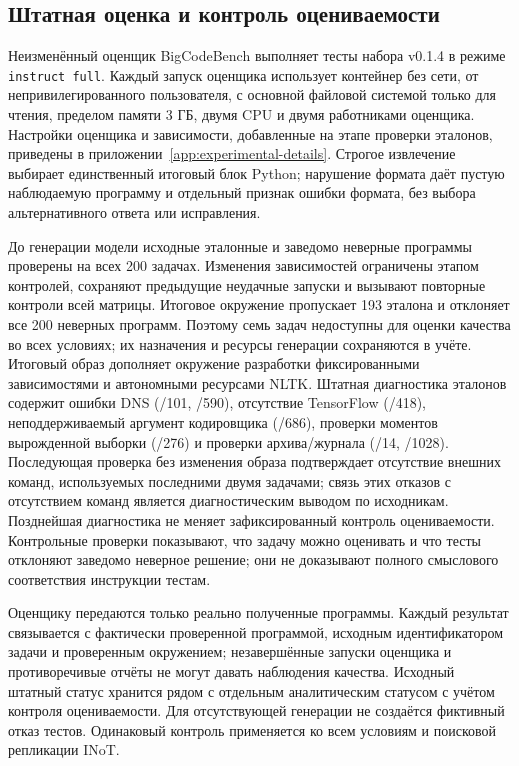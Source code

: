 \subsection{Штатная оценка и контроль оцениваемости}
Неизменённый оценщик BigCodeBench выполняет тесты набора v0.1.4 в режиме \texttt{instruct full}. Каждый запуск оценщика использует контейнер без сети, от непривилегированного пользователя, с основной файловой системой только для чтения, пределом памяти 3 ГБ, двумя CPU и двумя работниками оценщика. Настройки оценщика и зависимости, добавленные на этапе проверки эталонов, приведены в приложении~\ref{app:experimental-details}. Строгое извлечение выбирает единственный итоговый блок Python; нарушение формата даёт пустую наблюдаемую программу и отдельный признак ошибки формата, без выбора альтернативного ответа или исправления.

До генерации модели исходные эталонные и заведомо неверные программы проверены на всех 200 задачах. Изменения зависимостей ограничены этапом контролей, сохраняют предыдущие неудачные запуски и вызывают повторные контроли всей матрицы. Итоговое окружение пропускает 193 эталона и отклоняет все 200 неверных программ. Поэтому семь задач недоступны для оценки качества во всех условиях; их назначения и ресурсы генерации сохраняются в учёте. Итоговый образ дополняет окружение разработки фиксированными зависимостями и автономными ресурсами NLTK. Штатная диагностика эталонов содержит ошибки DNS (/101, /590), отсутствие TensorFlow (/418), неподдерживаемый аргумент кодировщика (/686), проверки моментов вырожденной выборки (/276) и проверки архива/журнала (/14, /1028). Последующая проверка без изменения образа подтверждает отсутствие внешних команд, используемых последними двумя задачами; связь этих отказов с отсутствием команд является диагностическим выводом по исходникам. Позднейшая диагностика не меняет зафиксированный контроль оцениваемости. Контрольные проверки показывают, что задачу можно оценивать и что тесты отклоняют заведомо неверное решение; они не доказывают полного смыслового соответствия инструкции тестам.

Оценщику передаются только реально полученные программы. Каждый результат связывается с фактически проверенной программой, исходным идентификатором задачи и проверенным окружением; незавершённые запуски оценщика и противоречивые отчёты не могут давать наблюдения качества. Исходный штатный статус хранится рядом с отдельным аналитическим статусом с учётом контроля оцениваемости. Для отсутствующей генерации не создаётся фиктивный отказ тестов. Одинаковый контроль применяется ко всем условиям и поисковой репликации INoT.

